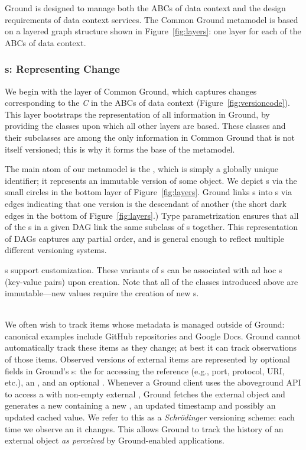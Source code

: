 \documentclass{cidr-2017}
\begin{document}
Ground is designed to manage both the ABCs of data context and the design requirements of data context services.
The Common Ground metamodel is based on a layered graph structure shown in Figure~\ref{fig:layers}: one layer for each of the ABCs of data context.

\subsubsection{{\VersionGraph}s: Representing Change}

We begin with the \versiongraph layer of Common Ground, which captures changes corresponding to the \emph{C} in the ABCs of data context (Figure~\ref{fig:versioncode}).
This layer bootstraps the representation of all information in Ground, by providing the classes upon which all other layers are based. These classes and their subclasses are among the only information in Common Ground that is not itself versioned; this is why it forms the base of the metamodel.

The main atom of our metamodel is the \version, which is simply a globally unique identifier; it represents an immutable version of some object. We
depict \version{}s via the small circles in the bottom layer of Figure~\ref{fig:layers}.
Ground links {\version}s into s via  edges
indicating that one version is the descendant of another (the short dark edges in the bottom of Figure~\ref{fig:layers}.)
Type parametrization ensures that all of the s in a given DAG link the same subclass of {\version}s together.
This representation of DAGs captures any partial order, and is general enough to reflect multiple different versioning systems.

s support customization. These variants of \version{}s can be associated with
ad hoc {\gtag}s (key-value pairs) upon creation. Note that all of the classes introduced above are immutable---new values require the creation of new \version{}s.

\\
We often wish to track items whose metadata is managed outside of Ground: canonical examples
include GitHub repositories and Google Docs. Ground cannot automatically track these items as they change;
at best it can track observations of those items.
Observed versions of external items are represented by optional fields in Ground's s: the  for accessing the
reference (e.g., port, protocol, URI, etc.), an , and an optional . 
Whenever a Ground client uses the aboveground API to access a  with non-empty external , Ground fetches the external object and generates a new  containing a new
, an updated timestamp and possibly an updated cached value. We refer to this as a \emph{Schr\"{o}dinger} versioning scheme: each time we observe an  it changes. This allows Ground to track the history of an external object \emph{as perceived} by Ground-enabled applications.
\end{document}
